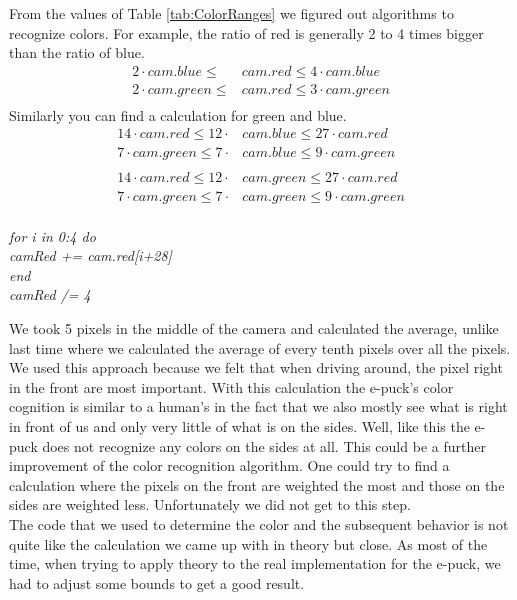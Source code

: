 \documentclass[a4paper]{article}
\begin{document}
			\noindent From the values of Table \ref{tab:ColorRanges} we figured out algorithms 
			to recognize colors. For example, the ratio of red is generally 2 to 4 times bigger 
			than the ratio of blue.	
			\begin{align*}
				2 \cdot cam.blue \leq &cam.red \leq 4 \cdot cam.blue \\
				2 \cdot cam.green \leq &cam.red \leq 3 \cdot cam.green\\
			\end{align*}
			Similarly you can find a calculation for green and blue.
			\begin{align*}
				14 \cdot cam.red \leq 12 \cdot &cam.blue \leq 27 \cdot cam.red \\
				7 \cdot cam.green \leq 7 \cdot &cam.blue \leq 9 \cdot cam.green\\
				\\
				14 \cdot cam.red \leq 12 \cdot &cam.green \leq 27 \cdot cam.red \\
				7 \cdot cam.green \leq 7 \cdot &cam.green \leq 9 \cdot cam.green\\
			\end{align*}	
			\newpage
			
			\textit
			{
				for i in 0:4 do\\  \indent \indent camRed += cam.red[i+28]\\ \indent end\\ 
				\indent camRed /= 4\\
			}			
				
			\noindent We took 5 pixels in the middle of the camera and calculated the average, 
			unlike last time where we calculated the average of every tenth pixels over all the 
			pixels. We used this approach because we felt that when driving around, the pixel 
			right in the front are most important. With this calculation the e-puck's color 
			cognition is similar to a human's in the fact that we also mostly see what is right 
			in front of us and only very little of what is on the sides. Well, like this the e-
			puck does not recognize any colors on the sides at all. This could be a further 
			improvement of the color recognition algorithm. One could try to find a calculation 
			where the pixels on the front are weighted the most and those on the sides are 
			weighted less. Unfortunately we did not get to this step.\\
			
			\noindent The code that we used to determine the color and the subsequent behavior is 
			not quite like the calculation we came up with in theory but close. As most of the 
			time, when trying to apply theory to the real implementation for the e-puck, we had to 
			adjust some bounds to get a good result.\\
			
\end{document}
